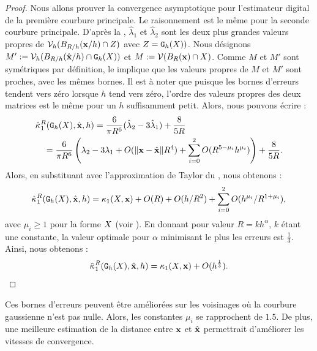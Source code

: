 \begin{proof}
  Nous allons prouver la convergence asymptotique pour l'estimateur digital de la
  première courbure principale. Le raisonnement est le même pour la seconde
  courbure principale. D'après la ,
  $\hat{\lambda}_1$ et $\hat{\lambda}_2$ sont les deux plus grandes valeurs
  propres de $\DCov{h}(\Ball{R/h}{\vx / h} \cap \DigShape)$ avec
  $Z=\DigF{X}{h})$. Nous désignons $M' \EqDef \DCov{h}(\Ball{R/h}{\hat{\vx}/h}
  \cap \DSh)$ et $M \EqDef \Cov(\Ball{R}{\vx} \cap \Shape )$. Comme $M$ et $M'$
  sont symétriques par définition, le  implique que
  les valeurs propres de $M$ et $M'$ sont proches, avec les mêmes bornes. Il est à
  noter que puisque les bornes d'erreurs tendent vers zéro lorsque $h$ tend vers
  zéro, l'ordre des valeurs propres des deux matrices est le même pour un $h$
  suffisamment petit. Alors, nous pouvons écrire :
  \begin{align}
    &\PrincCurvH{1}{R}(\DSh,\hat{\vx},h) = \frac{6}{\pi R^6}(\hat{\lambda}_2 - 3\hat{\lambda}_1) + \frac{8}{5R} \\
    &\quad = \frac{6}{\pi R^6} \left( \lambda_2 - 3\lambda_1 + O(\|\vx-\hat{\vx}\| R^4) + \sum_{i=0}^2 O(R^{5-\mu_i}h^{\mu_i}) \right) + \frac{8}{5R}.
  \end{align}
  Alors, en substituant avec l'approximation de Taylor du
  , nous obtenons :
  \begin{equation} \label{eq:error-term-conv-mean-curv-est}
    \PrincCurvH{1}{R}(\DSh,\hat{\vx},h) = \PrincCurv{1}(\Shape,\vx) + O(R) + O( h/R^2) + \sum_{i=0}^2 O(h^{\mu_i}/R^{1+\mu_i}) ,
  \end{equation}
  avec $\mu_i \ge 1$ pour la forme $\Shape$ (voir
  ). En donnant pour valeur $R =
  kh^\alpha$, $k$ étant une constante, la valeur optimale pour $\alpha$
  minimisant le plus les erreurs est $\frac{1}{3}$. Ainsi, nous obtenons :
  \begin{equation}
    \PrincCurvH{1}{R}(\DSh,\hat{\vx},h) = \PrincCurv{1}(\Shape,\vx) + O(h^{\frac{1}{3}}).
  \end{equation}
\end{proof}
%
Ces bornes d'erreurs peuvent être améliorées sur les
voisinages où la courbure gaussienne n'est pas nulle. Alors, les constantes
$\mu_i$ se rapprochent de $1.5$. De plus, une meilleure estimation de la
distance entre $\vx$ et $\hat{\vx}$ permettrait d'améliorer les vitesses de
convergence.


